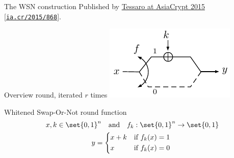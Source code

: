 \begin{frame}{The WSN construction}
    \centering
    Published by \href{https://doi.org/10.1007/978-3-662-48800-3_18}{Tessaro at AsiaCrypt 2015} [\texttt{\href{https://ia.cr/2015/868}{ia.cr/2015/868}}].
    \begin{minipage}[t][90pt][t]{0.47\textwidth}
        \begin{block}{Overview round, iterated $r$ times\vpPp}
            \centering
            \vfill
            \includegraphics{data/wsn-schematic-1round}
            \vfill
        \end{block}
    \end{minipage}
    \hfill
    \begin{minipage}[t][90pt][t]{0.47\textwidth}
        \begin{block}{Whitened Swap-Or-Not round function}
            \vspace*{-12.5pt}
            \begin{gather*}
                x, k \in \set{0,1}^n \quad\text{and}\quad f_{k} : \set{0,1}^n \to \set{0,1} \\
                y = \begin{cases*}
                    x + k & if $f_{k}(x) = 1$ \\
                    x     & if $f_{k}(x) = 0$
                    \end{cases*}
            \end{gather*}
        \end{block}
    \end{minipage}

\end{frame}

